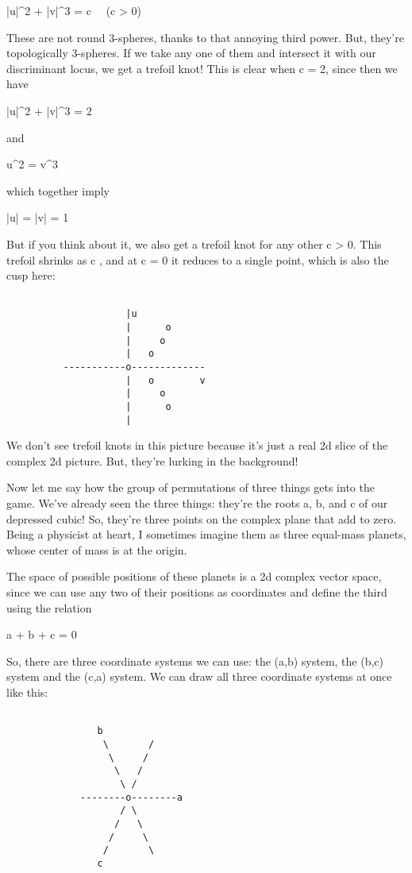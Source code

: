|u|^{2} + |v|^{3} = c     \  \             (c > 0)

These are not round 3-spheres, thanks to that annoying third power.
But, they're topologically 3-spheres.  If we take any one of them 
and intersect it with our discriminant locus, we get a trefoil knot!  
This is clear when c = 2, since then we have

|u|^{2} + |v|^{3} = 2

and 

u^{2} = v^{3}

which together imply 

|u| = |v| = 1

But if you think about it, we also get a trefoil knot for any other
c > 0.  This trefoil shrinks as c , and at c = 0 it reduces to a 
single point, which is also the cusp here:


\begin{verbatim}

                     |u         
                     |      o
                     |     o
                     |   o
          -----------o-------------
                     |   o        v
                     |     o
                     |      o
                     |          
\end{verbatim}
    
We don't see trefoil knots in this picture because it's just a
real 2d slice of the complex 2d picture.  But, they're lurking in
the background!  

Now let me say how the group of permutations of three things
gets into the game.  We've already seen the three things: they're 
the roots a, b, and c of our depressed cubic!  So, they're three
points on the complex plane that add to zero.  Being a physicist
at heart, I sometimes imagine them as three equal-mass planets, 
whose center of mass is at the origin.

The space of possible positions of these planets is a 2d complex
vector space, since we can use any two of their positions as 
coordinates and define the third using the relation

a + b + c = 0

So, there are three coordinate systems we can use: the (a,b)
system, the (b,c) system and the (c,a) system.  We can draw all 
three coordinate systems at once like this:


\begin{verbatim}

                b         
                 \       /
                  \     /
                   \   /
                    \ /
             --------o--------a
                    / \
                   /   \
                  /     \
                 /       \
                c
\end{verbatim}
    
